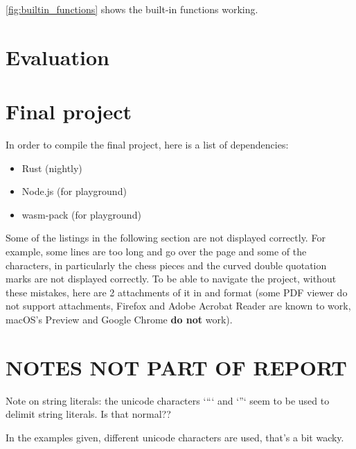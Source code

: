 \documentclass{article}
\begin{document}
\autoref{fig:builtin_functions} shows the built-in functions working.

\section{Evaluation}


\section{Final project}
\label{sec:final_project}

In order to compile the final project, here is a list of dependencies:

\begin{itemize}
	\item Rust (nightly)
	\item Node.js (for playground)
	\item wasm-pack (for playground)
\end{itemize}

Some of the listings in the following section are not displayed correctly. For
example, some lines are too long and go over the page and some of the
characters, in particularly the chess pieces and the curved double quotation
marks are not displayed correctly. To be able to navigate the project, without
these mistakes, here are 2 attachments of it in
 and
 format (some PDF viewer do not
support attachments, Firefox and Adobe Acrobat Reader are known to work,
macOS's Preview and Google Chrome \textbf{do not} work).



\section{NOTES NOT PART OF REPORT}

Note on string literals: the unicode characters `“` and `”` seem to be used to
delimit string literals. Is that normal??

In the examples given, different unicode characters are used, that's a bit
wacky.
\end{document}
